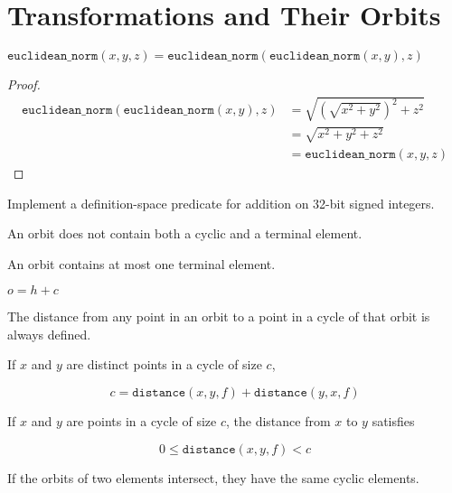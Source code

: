 
\chapter{Transformations and Their Orbits}

\begin{lemma}
	$\mathtt{euclidean\_norm}(x, y, z) = \mathtt{euclidean\_norm}(\mathtt{euclidean\_norm}(x, y), z)$
\end{lemma}

\begin{proof}
	\begin{align*}
		\mathtt{euclidean\_norm}(\mathtt{euclidean\_norm}(x, y), z)
		&= \sqrt{\left (\sqrt{x^2 + y^2} \right )^2 + z^2}\\
		&= \sqrt{x^2 + y^2 + z^2}\\
		&= \mathtt{euclidean\_norm}(x, y, z)
	\end{align*}
\end{proof}

\begin{exercise}
	Implement a definition-space predicate for addition on 32-bit signed integers.
\end{exercise}



\begin{lemma}
	An orbit does not contain both a cyclic and a terminal element.
\end{lemma}

\begin{lemma}
	An orbit contains at most one terminal element.
\end{lemma}

\begin{lemma}
	$o = h + c$
\end{lemma}

\begin{lemma}
	The distance from any point in an orbit to a point in a cycle
	of that orbit is always defined.
\end{lemma}

\begin{lemma}
	If $x$ and $y$ are distinct points in a cycle of size $c$,
	
	\[ c = \mathtt{distance}(x, y, f) + \mathtt{distance}(y, x, f) \]
\end{lemma}

\begin{lemma}
	If $x$ and $y$ are points in a cycle of size $c$, the distance from $x$
	to $y$ satisfies

	\[ 0 \leq \mathtt{distance}(x, y, f) < c \]
\end{lemma}

\begin{lemma}
	If the orbits of two elements intersect, they have the same
	cyclic elements.
\end{lemma}
